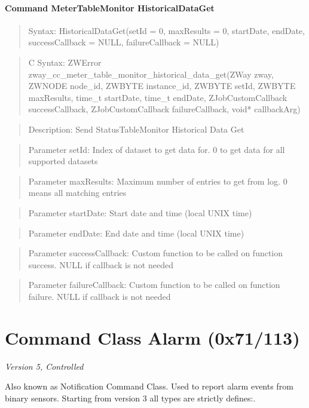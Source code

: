 \paragraph{Command MeterTableMonitor HistoricalDataGet}
\begin{quote}Syntax: HistoricalDataGet(setId = 0, maxResults = 0, startDate, endDate, successCallback = NULL, failureCallback = NULL)\end{quote}
\begin{quote}C Syntax: ZWError zway\_cc\_meter\_table\_monitor\_historical\_data\_get(ZWay zway, ZWNODE node\_id, ZWBYTE instance\_id, ZWBYTE setId, ZWBYTE maxResults, time\_t startDate, time\_t endDate, ZJobCustomCallback successCallback, ZJobCustomCallback failureCallback, void* callbackArg)\end{quote}
\begin{quote}Description: Send StatusTableMonitor Historical Data Get\end{quote}
\begin{quote}Parameter setId: Index of dataset to get data for. 0 to get data for all supported datasets\end{quote}
\begin{quote}Parameter maxResults: Maximum number of entries to get from log. 0 means all matching entries\end{quote}
\begin{quote}Parameter startDate: Start date and time (local UNIX time)\end{quote}
\begin{quote}Parameter endDate: End date and time (local UNIX time)\end{quote}
\begin{quote}Parameter successCallback: Custom function to be called on function success. NULL if callback is not needed\end{quote}
\begin{quote}Parameter failureCallback: Custom function to be called on function failure. NULL if callback is not needed\end{quote}



\section{Command Class Alarm (0x71/113)}

\textit{Version 5, Controlled}
\newline

Also known as Notification Command Class. Used to report alarm events from binary sensors. Starting from version 3 all types are strictly defines:. 

